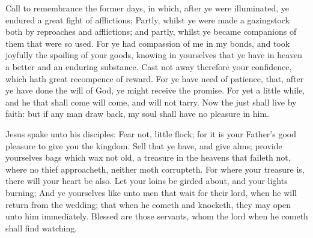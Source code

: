  Call to remembrance the former days, in which, after ye were illuminated, ye endured a great fight of afflictions; Partly, whilst ye were made a gazingstock both by reproaches and afflictions; and partly, whilst ye became companions of them that were so used. For ye had compassion of me in my bonds, and took joyfully the spoiling of your goods, knowing in yourselves that ye have in heaven a better and an enduring substance. Cast not away therefore your confidence, which hath great recompence of reward. For ye have need of patience, that, after ye have done the will of God, ye might receive the promise. For yet a little while, and he that shall come will come, and will not tarry. Now the just shall live by faith: but if any man draw back, my soul shall have no pleasure in him.


\tractalleluianotice


\vspace{-0.2\baselineskip}


\vspace{-0.14\baselineskip}

 Jesus spake unto his disciples: Fear not, little flock; for it is your Father's good pleasure to give you the kingdom. Sell that ye have, and give alms; provide yourselves bags which wax not old, a treasure in the heavens that faileth not, where no thief approacheth, neither moth corrupteth. For where your treasure is, there will your heart be also. Let your loins be girded about, and your lights burning; And ye yourselves like unto men that wait for their lord, when he will return from the wedding; that when he cometh and knocketh, they may open unto him immediately. Blessed are those servants, whom the lord when he cometh shall find watching.


